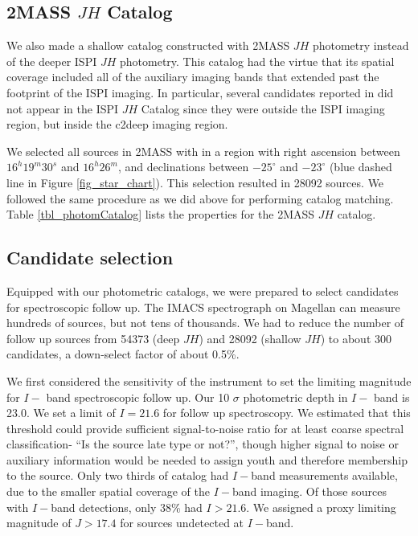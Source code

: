 \subsection{2MASS $JH$ Catalog}
We also made a shallow catalog constructed with 2MASS $JH$ photometry instead of the deeper ISPI $JH$ photometry.  This catalog had the virtue that its spatial coverage included all of the auxiliary imaging bands that extended past the footprint of the ISPI imaging.  In particular, several candidates reported in \citet{2010ApJ...720.1374H} did not appear in the ISPI $JH$ Catalog since they were outside the ISPI imaging region, but inside the c2deep imaging region.

We selected all sources in 2MASS with in a region with right ascension between $16^h19^m30^s$ and $16^h26^m$, and declinations between $-25^{\circ}$ and $-23^{\circ}$ (blue dashed line in Figure \ref{fig_star_chart}).  This selection resulted in 28092 sources.  We followed the same procedure as we did above for performing catalog matching.  Table \ref{tbl_photomCatalog} lists the properties for the 2MASS $JH$ catalog.


\subsection{Candidate selection}


Equipped with our photometric catalogs, we were prepared to select candidates for spectroscopic follow up.  The IMACS spectrograph on Magellan can measure hundreds of sources, but not tens of thousands.  We had to reduce the number of follow up sources from 54373 (deep $JH$) and 28092 (shallow $JH$) to about 300 candidates, a down-select factor of about 0.5\%.  

We first considered the sensitivity of the instrument to set the limiting magnitude for $I-$ band spectroscopic follow up.  Our 10 $\sigma$ photometric depth in $I-$ band is 23.0.  We set a limit of $I=21.6$ for follow up spectroscopy.  We estimated that this threshold could provide sufficient signal-to-noise ratio for at least coarse spectral classification- ``Is the source late type or not?'', though higher signal to noise or auxiliary information would be needed to assign youth and therefore membership to the source.  Only two thirds of catalog had $I-$band measurements available, due to the smaller spatial coverage of the $I-$band imaging.  Of those sources with $I-$band detections, only 38\% had $I>21.6$.  We assigned a proxy limiting magnitude of $J>17.4$ for sources undetected at $I-$band.


